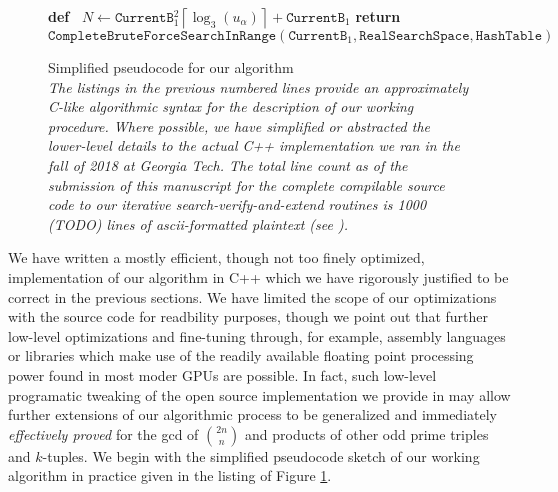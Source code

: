 \documentclass[12pt]{article}
\begin{document}
\begin{figure}[ht!]
\begin{algorithm}[H]
     \textbf{def\ } $N \longleftarrow \mathtt{CurrentB}_1^2 \left\lceil \log_3(u_{\alpha}) \right\rceil + 
                     \mathtt{CurrentB}_1$\; 
     \BlankLine
     \textbf{return\ } $\mathtt{CompleteBruteForceSearchInRange}(\mathtt{CurrentB}_1, 
                                               \mathtt{RealSearchSpace}, \mathtt{HashTable})$\;
\end{algorithm} 

\caption{Simplified pseudocode for our algorithm \\ 
             \em The listings in the previous numbered lines provide an approximately C-like 
             algorithmic syntax for the description of our working procedure. 
             Where possible, we have simplified or abstracted the lower-level details to the 
             actual C++ implementation we ran in the fall of 2018 at Georgia Tech. 
             The total line count as of the submission of this manuscript for the complete 
             compilable source code to our iterative search-verify-and-extend routines is 
             1000 (TODO) lines of ascii-formatted plaintext (see \cite{105-PROBLEM-GITHUBREPO}).} 
\label{figure_AlgPseudoCode} 

\end{figure} 

We have written a mostly efficient, though not too finely optimized, implementation of our 
algorithm in C++ which we have rigorously justified to be correct in the previous sections. 
We have limited the scope of 
our optimizations with the source code for readbility purposes, though we point out that further 
low-level optimizations and fine-tuning through, for example, assembly languages or libraries which 
make use of the readily available floating point processing power found in most moder GPUs are possible. 
In fact, such low-level programatic tweaking of the open source implementation we provide in 
\cite{105-PROBLEM-GITHUBREPO} may allow further extensions of our algorithmic process to be 
generalized and immediately \emph{effectively proved} for the gcd of $\binom{2n}{n}$ and products of 
other odd prime triples and $k$-tuples. We begin with the simplified pseudocode sketch of our working 
algorithm in practice given in the listing of Figure \ref{figure_AlgPseudoCode}. 
\end{document}
